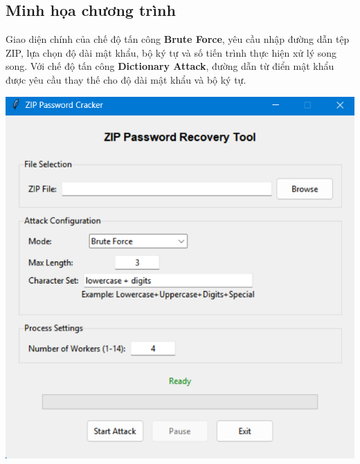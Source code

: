\documentclass[../DoAn.tex]{subfiles}
\begin{document}
\subsection{Minh họa chương trình}
Giao diện chính của chế độ tấn công \textbf{Brute Force}, yêu cầu nhập đường dẫn tệp ZIP, lựa chọn độ dài mật khẩu, bộ ký tự và số tiến trình thực hiện xử lý song song. Với chế độ tấn công \textbf{Dictionary Attack}, đường dẫn từ điển mật khẩu được yêu cầu thay thế cho độ dài mật khẩu và bộ ký tự.


\begin{minipage}[t]{0.45\textwidth}
    \centering
    \includegraphics[width=\textwidth]{Hinhanh/GUIBruteForce.png} %
\end{minipage}
\hfill %
\end{document}

